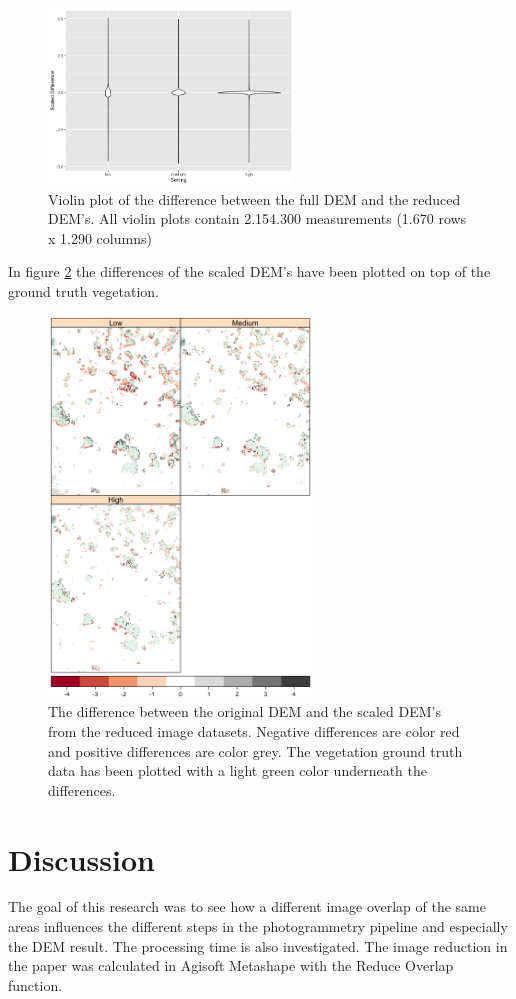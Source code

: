 \documentclass{isprs} %
\begin{document}
\begin{figure}[h]
    \centering
    \includegraphics[width=6.5cm]{ViolinPlotOrdered.png}
    \caption{Violin plot of the difference between the full DEM and the reduced DEM's. All violin plots contain 2.154.300 measurements (1.670 rows x 1.290 columns)}
    \label{fig:ViolinPlot}
\end{figure}

In figure \ref{fig:ScaledDifference} the differences of the scaled DEM's have been plotted on top of the ground truth vegetation.

\begin{figure}[h]
    \centering
    \includegraphics[width=7cm]{veg_diff_vert_2.png}
    \caption{The difference between the original DEM and the scaled DEM's from the reduced image datasets. Negative differences are color red and positive differences are color grey. The vegetation ground truth data has been plotted with a light green color underneath the differences.}
    \label{fig:ScaledDifference}
\end{figure}

\section{Discussion}
The goal of this research was to see how a different image overlap of the same areas influences the different steps in the photogrammetry pipeline and especially the DEM result.
The processing time is also investigated.
The image reduction in the paper was calculated in Agisoft Metashape with the Reduce Overlap function.
\end{document}
